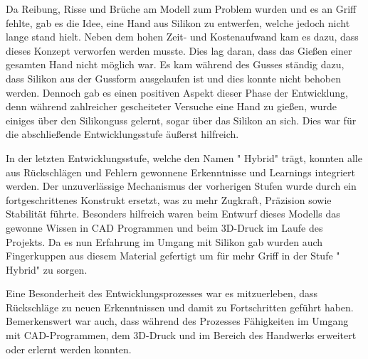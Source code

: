 \documentclass[titlepage,12pt,twoside]{article}
\begin{document}
{	Da Reibung, Risse und Brüche am Modell zum Problem wurden und es an Griff fehlte, gab es die Idee, eine Hand aus Silikon zu entwerfen, welche jedoch nicht lange stand hielt. Neben dem hohen Zeit- und Kostenaufwand kam es dazu, dass dieses Konzept verworfen werden musste. Dies lag daran, dass das Gießen einer gesamten Hand nicht möglich war. Es kam während des Gusses ständig dazu, dass Silikon aus der Gussform ausgelaufen ist und dies konnte nicht behoben werden. 
	Dennoch gab es einen positiven Aspekt dieser Phase der Entwicklung, denn während zahlreicher gescheiteter Versuche eine Hand zu gießen, wurde einiges über den Silikonguss gelernt, sogar über das Silikon an sich. Dies war für die abschließende Entwicklungsstufe äußerst hilfreich.
	
	In der letzten Entwicklungsstufe, welche den Namen " Hybrid" trägt, konnten alle aus Rückschlägen und Fehlern gewonnene Erkenntnisse und Learnings integriert werden. Der unzuverlässige Mechanismus der vorherigen Stufen wurde durch ein fortgeschrittenes Konstrukt ersetzt, was zu mehr Zugkraft, Präzision sowie Stabilität führte. Besonders hilfreich waren beim Entwurf dieses Modells das gewonne Wissen in CAD Programmen und beim 3D-Druck im Laufe des Projekts. Da es nun Erfahrung im Umgang mit Silikon gab wurden auch Fingerkuppen aus diesem Material gefertigt um für mehr Griff in der Stufe " Hybrid" zu sorgen.
	
	Eine Besonderheit des Entwicklungsprozesses war es mitzuerleben, dass Rückschläge zu neuen Erkenntnissen und damit zu Fortschritten geführt haben. Bemerkenswert war auch, dass während des Prozesses Fähigkeiten im Umgang mit CAD-Programmen, dem 3D-Druck und im Bereich des Handwerks erweitert oder erlernt werden konnten.
}
\\
\end{document}
